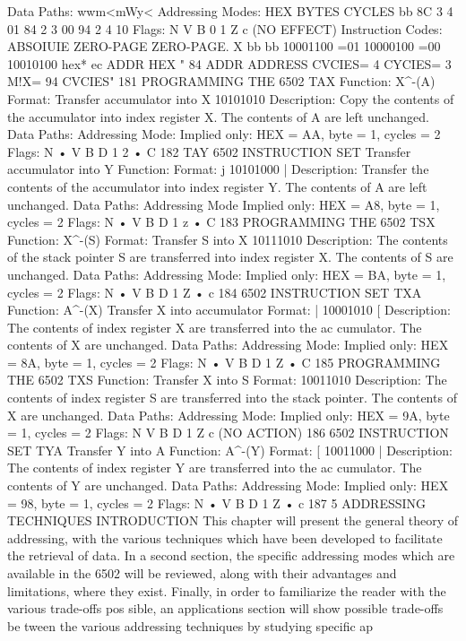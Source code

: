 Data Paths:
wwm<mWy<
Addressing Modes:
HEX
BYTES
CYCLES
bb
8C
3
4
01
84
2
3
00
94
2
4
10
Flags: N V B 0 1 Z c
(NO EFFECT)
Instruction Codes:
ABSOIUIE
ZERO-PAGE
ZERO-PAGE. X
bb
bb
10001100
=01
10000100
=00
10010100
hex* ec
ADDR
HEX " 84
ADDR
ADDRESS
CVCIES= 4
CYCIES= 3
M!X= 94 CVCIES"
181
PROGRAMMING THE 6502
TAX
Function:
X^-(A)
Format:
Transfer accumulator into X
10101010
Description:
Copy the contents of the accumulator into index register X. The
contents of A are left unchanged.
Data Paths:
Addressing Mode:
Implied only:
HEX = AA, byte = 1, cycles = 2
Flags:
N
•
V B D 1 2
•
C
182
TAY
6502 INSTRUCTION SET
Transfer accumulator into Y
Function:
Format: j 10101000 |
Description:
Transfer the contents of the accumulator into index register Y.
The contents of A are left unchanged.
Data Paths:
Addressing Mode
Implied only:
HEX = A8, byte = 1, cycles = 2
Flags:
N
•
V B D 1 z
•
C
183
PROGRAMMING THE 6502
TSX
Function:
X^-(S)
Format:
Transfer S into X
10111010
Description:
The contents of the stack pointer S are transferred into index
register X. The contents of S are unchanged.
Data Paths:
Addressing Mode:
Implied only:
HEX = BA, byte = 1, cycles = 2
Flags:
N
•
V B D 1 Z
•
c
184
6502 INSTRUCTION SET
TXA
Function:
A^-(X)
Transfer X into accumulator
Format: | 10001010 [
Description:
The contents of index register X are transferred into the ac
cumulator. The contents of X are unchanged.
Data Paths:
Addressing Mode:
Implied only:
HEX = 8A, byte = 1, cycles = 2
Flags:
N
•
V B D 1 Z
•
C
185
PROGRAMMING THE 6502
TXS
Function:
Transfer X into S
Format: 10011010
Description:
The contents of index register S are transferred into the stack
pointer. The contents of X are unchanged.
Data Paths:
Addressing Mode:
Implied only:
HEX = 9A, byte = 1, cycles = 2
Flags:
N V B D 1 Z c
(NO ACTION)
186
6502 INSTRUCTION SET
TYA Transfer Y into A
Function:
A^-(Y)
Format: [ 10011000 |
Description:
The contents of index register Y are transferred into the ac
cumulator. The contents of Y are unchanged.
Data Paths:
Addressing Mode:
Implied only:
HEX = 98, byte = 1, cycles = 2
Flags:
N
•
V B D 1 Z
•
c
187
5
ADDRESSING TECHNIQUES
INTRODUCTION
This chapter will present the general theory of addressing, with
the various techniques which have been developed to facilitate
the retrieval of data. In a second section, the specific addressing
modes which are available in the 6502 will be reviewed, along
with their advantages and limitations, where they exist. Finally,
in order to familiarize the reader with the various trade-offs pos
sible, an applications section will show possible trade-offs be
tween the various addressing techniques by studying specific ap

